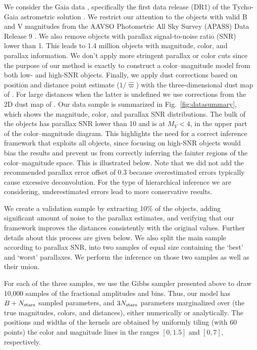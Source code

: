\documentclass[manuscript, letterpaper]{aastex6}
\newcommand{\figref}[1]{{\xspace}Fig.~\ref{#1}}
\newcommand{\nobj}{{N_{\rm stars}}}
\begin{document}
We consider the Gaia data \citep{gaia}, specifically the first data release (DR1) of the Tycho-Gaia astrometric solution \citep[hereafter TGAS,][]{gaia_dr1}.
We restrict our attention to the objects with valid B and V magnitudes from the AAVSO Photometric All Sky Survey (APASS) Data Release 9 \citep{munari2014, hendenmunari2014}. 
We also remove objects with parallax signal-to-noise ratio (SNR) lower than 1. 
This leads to 1.4 million objects with magnitude, color, and parallax information. 
We don't apply more stringent parallax or color cuts since the purpose of our method is exactly to construct a color--magnitude model from both low- and high-SNR objects. 
Finally, we apply dust corrections based on position and distance point estimate ($1/\hat{\varpi}$) with the three-dimensional dust map of \cite{Green2015bayestar}. 
For large distances when the latter is undefined we use corrections from the 2D dust map of \cite{sfd1998}.
Our data sample is summarized in \figref{fig:datasummary}, which shows the magnitude, color, and parallax SNR distributions.
The bulk of the objects has parallax SNR lower than 10 and is at $M_V  < 4$, in the upper part of the color--magnitude diagram.
This highlights the need for a correct inference framework that exploits all objects, since focusing on high-SNR objects would bias the results and prevent us from correctly inferring the fainter regions of the color--magnitude space.
This is illustrated below.
Note that we did not add the recommended parallax error offset of 0.3 because overestimated errors typically cause excessive deconvolution.
For the type of hierarchical inference we are considering, underestimated errors lead to more conservative results.

We create a validation sample by extracting 10\% of the objects, adding significant amount of noise to the parallax estimates, and verifying that our framework improves the distances consistently with the original values. 
Further details about this process are given below.
We also split the main sample according to parallax SNR, into two samples of equal size containing the `best' and `worst' parallaxes. 
We perform the inference on those two samples as well as their union.
 
For each of the three samples, we use the Gibbs sampler presented above to draw 10,000 samples of the fractional amplitudes and bins. 
Thus, our model has $B + \nobj$ sampled parameters, and $3 \nobj$ parameters marginalized over (the true magnitudes, colors, and distances), either numerically or analytically.
The positions and widths of the kernels are obtained by uniformly tiling (with 60 points) the color and magnitude lines in the ranges $[0, 1.5]$ and $[0, 7]$, respectively.
\end{document}
